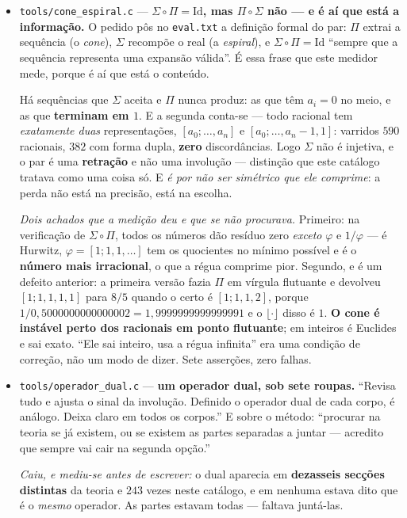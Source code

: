 \documentclass[11pt]{article}
\newcommand{\code}[1]{\texttt{\small #1}}
\theoremstyle{plain}
\theoremstyle{remark}
\begin{document}
\begin{itemize}
\item \code{tools/cone\_espiral.c} --- \textbf{$\Sigma\circ\Pi = \mathrm{Id}$, mas
$\Pi\circ\Sigma$ não --- e é aí que está a informação.} O pedido pôs no \code{eval.txt} a definição
formal do par: $\Pi$ extrai a sequência (o \emph{cone}), $\Sigma$ recompõe o real (a \emph{espiral}),
e $\Sigma\circ\Pi = \mathrm{Id}$ ``sempre que a sequência representa uma expansão válida''. É essa
frase que este medidor mede, porque é aí que está o conteúdo.

Há sequências que $\Sigma$ aceita e $\Pi$ nunca produz: as que têm $a_i = 0$ no meio, e as que
\textbf{terminam em $1$}. E a segunda conta-se --- todo racional tem \emph{exatamente duas}
representações, $[a_0;\ldots,a_n]$ e $[a_0;\ldots,a_n-1,1]$: varridos $590$ racionais, $382$ com
forma dupla, \textbf{zero} discordâncias. Logo $\Sigma$ não é injetiva, e o par é uma
\textbf{retração} e não uma involução --- distinção que este catálogo tratava como uma coisa só. E
\emph{é por não ser simétrico que ele comprime}: a perda não está na precisão, está na escolha.

\emph{Dois achados que a medição deu e que se não procurava.} Primeiro: na verificação de
$\Sigma\circ\Pi$, todos os números dão resíduo zero \emph{exceto} $\varphi$ e $1/\varphi$ --- é
Hurwitz, $\varphi = [1;1,1,\ldots]$ tem os quocientes no mínimo possível e é o \textbf{número mais
irracional}, o que a régua comprime pior. Segundo, e é um defeito anterior: a primeira versão fazia $\Pi$
em vírgula flutuante e devolveu $[1;1,1,1,1]$ para $8/5$ quando o certo é $[1;1,1,2]$, porque
$1/0{,}5000000000000002 = 1{,}9999999999999991$ e o $\lfloor\cdot\rfloor$ disso é $1$. \textbf{O
cone é instável perto dos racionais em ponto flutuante}; em inteiros é Euclides e sai exato.
``Ele sai inteiro, usa a régua infinita'' era uma condição de correção, não um modo de dizer. Sete
asserções, zero falhas.

\item \code{tools/operador\_dual.c} --- \textbf{um operador dual, sob sete roupas.} ``Revisa tudo e
ajusta o sinal da involução. Definido o operador dual de cada corpo, é análogo. Deixa claro em todos
os corpos.'' E sobre o método: ``procurar na teoria se já existem, ou se existem as partes separadas
a juntar --- acredito que sempre vai cair na segunda opção.''

\emph{Caiu, e mediu-se antes de escrever:} o dual aparecia em \textbf{dezasseis secções distintas}
da teoria e $243$ vezes neste catálogo, e em nenhuma estava dito que é o \emph{mesmo} operador. As
partes estavam todas --- faltava juntá-las.


\end{itemize}
\end{document}
